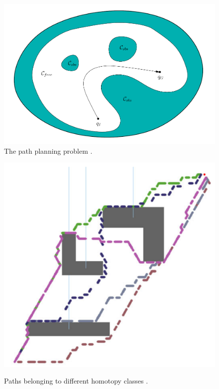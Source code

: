 \documentclass[11pt,twocolumn]{article}
\begin{document}
\begin{figure}[h] \centering \includegraphics[scale=.25]{cspace}
  \caption{The path planning problem
    \cite{lavallePlanningAlgorithms2006}.}
  \label{fig:cspace}
\end{figure}

\begin{figure}[h] \centering
  \includegraphics[scale=.2]{homotopy_classes}
  \label{fig:homotopy_classes}
  \caption{Paths belonging to different homotopy classes
    \cite{bhattacharyaPathHomotopyInvariants2018}.}
\end{figure}
\end{document}
